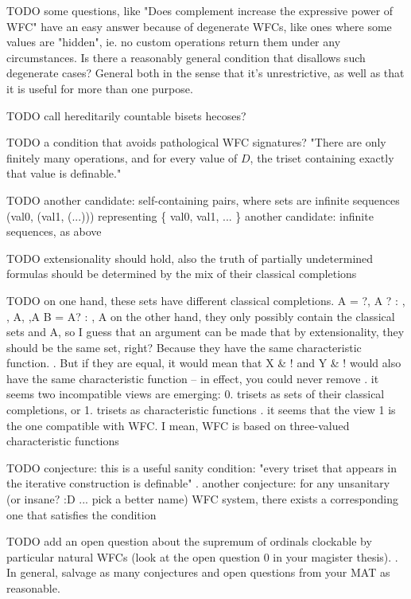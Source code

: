 \documentclass[oneside,12pt]{book}
\newcounter{question}
\theoremstyle{definition}
\theoremstyle{remark}
\begin{document}
TODO some questions, like "Does complement increase the expressive power of
WFC" have an easy answer because of degenerate WFCs, like ones where some values
are "hidden", ie. no custom operations return them under any circumstances.
Is there a reasonably general condition that disallows such degenerate cases?
General both in the sense that it's unrestrictive, as well as that it is useful
for more than one purpose.

TODO call hereditarily countable bisets hecoses?

TODO a condition that avoids pathological WFC signatures?
"There are only finitely many operations, and for every value of $D$,
the triset containing exactly that value is definable."

TODO another candidate: self-containing pairs, where sets are infinite
sequences (val0, (val1, (...))) representing \{ val0, val1, ... \}
another candidate: infinite sequences, as above

TODO extensionality should hold, also the truth of partially undetermined
formulas should be determined by the mix of their classical completions

TODO on one hand, these sets have different classical completions.
A = { {}?, { A }? }: {}, {{}}, {{A}}, {{},{A}}
B = { { A? } }     : {{}}, {{A}}
on the other hand, they only possibly contain the classical sets {} and {A},
so I guess that an argument can be made that by extensionality, they should
be the same set, right? Because they have the same characteristic function.
.
But if they are equal, it would mean that X \& !{{}} and Y \& !{{}} would also
have the same characteristic function -- in effect, you could never remove
.
it seems two incompatible views are emerging:
0. trisets as sets of their classical completions, or
1. trisets as characteristic functions
.
it seems that the view 1 is the one compatible with WFC. I mean, WFC
is based on three-valued characteristic functions

TODO conjecture: this is a useful sanity condition: "every triset that appears
in the iterative construction is definable"
.
another conjecture: for any unsanitary (or insane? :D ... pick a better name)
WFC system, there exists a corresponding one that satisfies the condition

TODO add an open question about the supremum of ordinals clockable by particular
natural WFCs (look at the open question 0 in your magister thesis).
.
In general, salvage as many conjectures and open questions from your MAT as reasonable.
\end{document}
